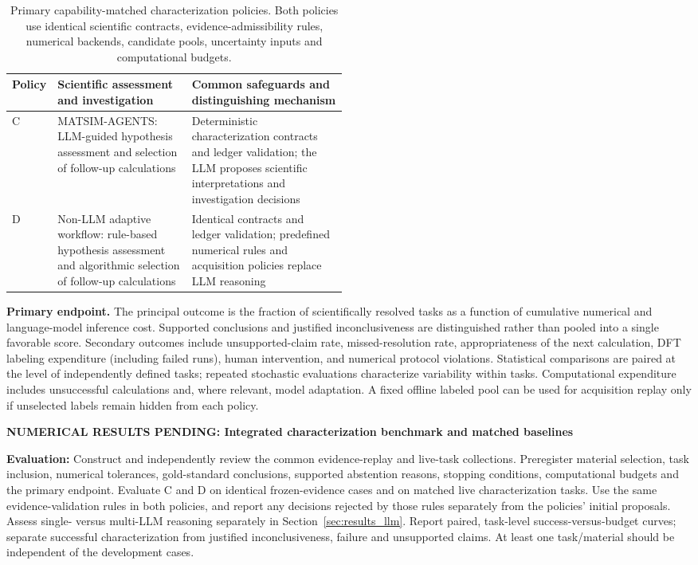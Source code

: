\documentclass[11pt,a4paper]{article}
\newcommand{\newexperiment}[2]{\par\medskip\noindent\begingroup\color{red!80!black}\textbf{NUMERICAL RESULTS PENDING: #1}\par\noindent\textbf{Evaluation:} #2\par\endgroup\medskip}
\begin{document}
\begin{table}[htbp]
\centering\small
\caption{Primary capability-matched characterization policies. Both policies use identical scientific contracts, evidence-admissibility rules, numerical backends, candidate pools, uncertainty inputs and computational budgets.}
\label{tab:characterization_arms}
\begin{tabularx}{\linewidth}{@{}p{0.09\linewidth}p{0.40\linewidth}X@{}}
\toprule
Policy & Scientific assessment and investigation & Common safeguards and distinguishing mechanism \\
\midrule
C & MATSIM-AGENTS: LLM-guided hypothesis assessment and selection of follow-up calculations & Deterministic characterization contracts and ledger validation; the LLM proposes scientific interpretations and investigation decisions \\
D & Non-LLM adaptive workflow: rule-based hypothesis assessment and algorithmic selection of follow-up calculations & Identical contracts and ledger validation; predefined numerical rules and acquisition policies replace LLM reasoning \\
\bottomrule
\end{tabularx}
\end{table}

\noindent\textbf{Primary endpoint.} The principal outcome is the fraction of scientifically resolved tasks as a function of cumulative numerical and language-model inference cost. Supported conclusions and justified inconclusiveness are distinguished rather than pooled into a single favorable score. Secondary outcomes include unsupported-claim rate, missed-resolution rate, appropriateness of the next calculation, DFT labeling expenditure (including failed runs), human intervention, and numerical protocol violations. Statistical comparisons are paired at the level of independently defined tasks; repeated stochastic evaluations characterize variability within tasks. Computational expenditure includes unsuccessful calculations and, where relevant, model adaptation. A fixed offline labeled pool can be used for acquisition replay only if unselected labels remain hidden from each policy.

\newexperiment{Integrated characterization benchmark and matched baselines}{Construct and independently review the common evidence-replay and live-task collections. Preregister material selection, task inclusion, numerical tolerances, gold-standard conclusions, supported abstention reasons, stopping conditions, computational budgets and the primary endpoint. Evaluate C and D on identical frozen-evidence cases and on matched live characterization tasks. Use the same evidence-validation rules in both policies, and report any decisions rejected by those rules separately from the policies' initial proposals. Assess single- versus multi-LLM reasoning separately in Section~\ref{sec:results_llm}. Report paired, task-level success-versus-budget curves; separate successful characterization from justified inconclusiveness, failure and unsupported claims. At least one task/material should be independent of the development cases.}
\end{document}
